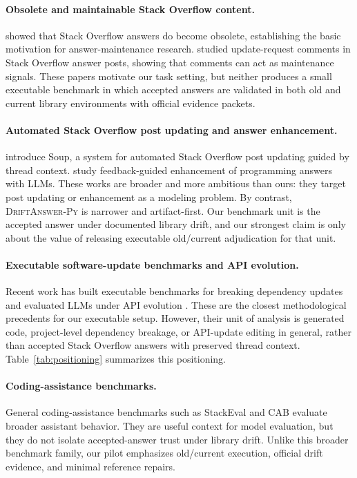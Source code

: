 \documentclass{article}
\newcommand{\dataset}{\textsc{DriftAnswer-Py}}
\begin{document}
\paragraph{Obsolete and maintainable Stack Overflow content.}
\citet{Zhang2019} showed that Stack Overflow answers do become obsolete, establishing the basic motivation for answer-maintenance research. \citet{Sheikhaei2023URC} studied update-request comments in Stack Overflow answer posts, showing that comments can act as maintenance signals. These papers motivate our task setting, but neither produces a small executable benchmark in which accepted answers are validated in both old and current library environments with official evidence packets.

\paragraph{Automated Stack Overflow post updating and answer enhancement.}
\citet{Mai2025TowardsBetterAnswers} introduce Soup, a system for automated Stack Overflow post updating guided by thread context. \citet{Bappon2026} study feedback-guided enhancement of programming answers with LLMs. These works are broader and more ambitious than ours: they target post updating or enhancement as a modeling problem. By contrast, \dataset{} is narrower and artifact-first. Our benchmark unit is the accepted answer under documented library drift, and our strongest claim is only about the value of releasing executable old/current adjudication for that unit.

\paragraph{Executable software-update benchmarks and API evolution.}
Recent work has built executable benchmarks for breaking dependency updates \citep{reyes2024bump, reyes2025byam} and evaluated LLMs under API evolution \citep{Wang2025, zhuo2025apimisuse, Liu2025}. These are the closest methodological precedents for our executable setup. However, their unit of analysis is generated code, project-level dependency breakage, or API-update editing in general, rather than accepted Stack Overflow answers with preserved thread context. Table~\ref{tab:positioning} summarizes this positioning.

\paragraph{Coding-assistance benchmarks.}
General coding-assistance benchmarks such as StackEval \citep{Shah2024} and CAB \citep{Kim2026} evaluate broader assistant behavior. They are useful context for model evaluation, but they do not isolate accepted-answer trust under library drift. Unlike this broader benchmark family, our pilot emphasizes old/current execution, official drift evidence, and minimal reference repairs.
\end{document}
